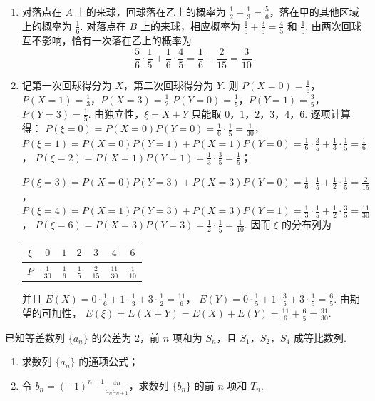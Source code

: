 \begin{solution}
\begin{enumerate}
\item 对落点在 \(A\) 上的来球，回球落在乙上的概率为
\(\frac12+\frac13=\frac56\)，落在甲的其他区域上的概率为 \(\frac16\). 对落点在 \(B\) 上的来球，相应概率为
\(\frac15+\frac35=\frac45\) 和 \(\frac15\). 由两次回球互不影响，恰有一次落在乙上的概率为
\[
\frac56\cdot\frac15+\frac16\cdot\frac45=\frac16+\frac2{15}=\frac3{10}
\]
\item 记第一次回球得分为 \(X\)，第二次回球得分为 \(Y\). 则
\(P(X=0)=\frac16\)，\(P(X=1)=\frac13\)，\(P(X=3)=\frac12\)
\(P(Y=0)=\frac15\)，\(P(Y=1)=\frac35\)，\(P(Y=3)=\frac15\).
由独立性，\(\xi=X+Y\) 只能取 \(0\)，\(1\)，\(2\)，\(3\)，\(4\)，\(6\). 逐项计算得：
\(P(\xi=0)=P(X=0)P(Y=0)=\frac16\cdot\frac15=\frac1{30}\)，
\(P(\xi=1)=P(X=0)P(Y=1)+P(X=1)P(Y=0)=\frac16\cdot\frac35+\frac13\cdot\frac15=\frac16\)，
\(P(\xi=2)=P(X=1)P(Y=1)=\frac13\cdot\frac35=\frac15\)；

\(P(\xi=3)=P(X=0)P(Y=3)+P(X=3)P(Y=0)=\frac16\cdot\frac15+\frac12\cdot\frac15=\frac2{15}\)，
\(P(\xi=4)=P(X=1)P(Y=3)+P(X=3)P(Y=1)=\frac13\cdot\frac15+\frac12\cdot\frac35=\frac{11}{30}\)，
\(P(\xi=6)=P(X=3)P(Y=3)=\frac12\cdot\frac15=\frac1{10}\). 因而 \(\xi\) 的分布列为
\begin{center}
\begin{tabular}{|c|c|c|c|c|c|c|}
\hline
\(\xi\) & \(0\) & \(1\) & \(2\) & \(3\) & \(4\) & \(6\) \\
\hline
\(P\) & \(\frac{1}{30}\) & \(\frac{1}{6}\) & \(\frac{1}{5}\) & \(\frac{2}{15}\) & \(\frac{11}{30}\) & \(\frac{1}{10}\) \\
\hline
\end{tabular}
\end{center}
并且
\(E(X)=0\cdot\frac16+1\cdot\frac13+3\cdot\frac12=\frac{11}{6}\)，
\(E(Y)=0\cdot\frac15+1\cdot\frac35+3\cdot\frac15=\frac65\). 由期望的可加性，
\(E(\xi)=E(X+Y)=E(X)+E(Y)=\frac{11}{6}+\frac65=\frac{91}{30}\).
\end{enumerate}
\end{solution}

\begin{problem}
已知等差数列 \(\{a_{n}\}\) 的公差为 2，前 \(n\) 项和为 \(S_{n}\)，且 \(S_{1}\)，\(S_{2}\)，\(S_{4}\) 成等比数列.

\begin{enumerate}
\item 求数列 \(\{a_{n}\}\) 的通项公式；
\item 令 \( b_n = (-1)^{n-1} \frac{4n}{a_n a_{n+1}} \)，求数列 \(\{b_n\}\) 的前 \(n\) 项和 \(T_n\).
\end{enumerate}
\end{problem}


